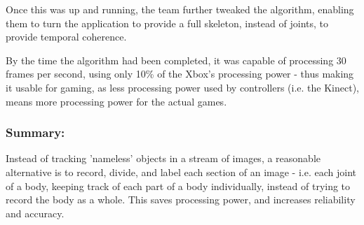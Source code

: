 Once this was up and running, the team further tweaked the algorithm, enabling them to turn the application to provide a full skeleton, instead of joints, to provide temporal coherence.

By the time the algorithm had been completed, it was capable of processing 30 frames per second, using only 10\% of the Xbox's processing power - thus making it usable for gaming, as less processing power used by controllers (i.e. the Kinect), means more processing power for the actual games.

\subsubsection*{Summary:}
Instead of tracking 'nameless' objects in a stream of images, a reasonable alternative is to record, divide, and label each section of an image - i.e. each joint of a body, keeping track of each part of a body individually, instead of trying to record the body as a whole. This saves processing power, and increases reliability and accuracy.